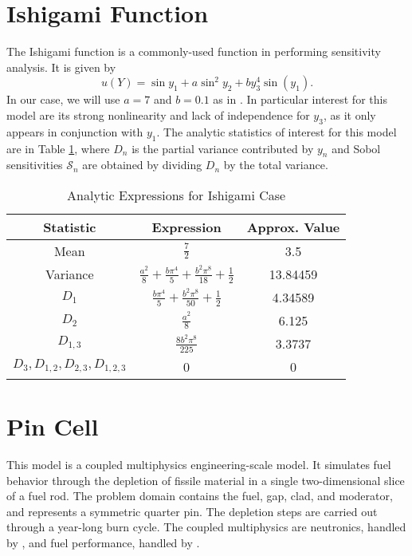 \section{Ishigami Function}\label{mod:ishigami}
The Ishigami function \cite{ishigami} is a commonly-used function in performing sensitivity analysis.  It is
given by
\begin{equation}
  u(Y) = \sin{y_1} + a\sin^2{y_2} + b y_3^4\sin(y_1).
\end{equation}
In our case, we will use $a=7$ and $b=0.1$ as in \cite{ishigami2}.  In particular interest for this model are
its strong nonlinearity and lack of independence for $y_3$, as it only appears in conjunction with $y_1$.  The
analytic statistics of interest for this model are in Table \ref{tab:ishigami moments}, where $D_n$ is the
partial variance contributed by $y_n$ and Sobol sensitivities $\mathcal{S}_n$ are obtained by dividing $D_n$
by the total variance.

\begin{table}[H]
  \centering
  \begin{tabular}{c|c|c}
  Statistic & Expression & Approx. Value \\\hline
  Mean & $\frac{7}{2}$ & 3.5 \\
  Variance & $\frac{a^2}{8} + \frac{b\pi^4}{5} + \frac{b^2\pi^8}{18} + \frac{1}{2}$ & 13.84459 \\
  $D_1$ & $\frac{b\pi^4}{5} + \frac{b^2\pi^8}{50} + \frac{1}{2} $ &  4.34589 \\
  $D_2$ & $\frac{a^2}{8}$ & 6.125 \\
  $D_{1,3}$ & $\frac{8b^2\pi^8}{225}$ & 3.3737 \\
  $D_3,D_{1,2},D_{2,3},D_{1,2,3}$ & 0 & 0
  \end{tabular}
  \caption{Analytic Expressions for Ishigami Case}
  \label{tab:ishigami moments}
\end{table}

\section{Pin Cell}\label{mod:pincell}
This model is a coupled multiphysics engineering-scale model.  It simulates fuel behavior through the depletion of fissile material
in a single two-dimensional slice of a fuel rod.  The problem domain contains the fuel, gap, clad, and
moderator, and represents a symmetric quarter pin.  The depletion steps are carried out through a year-long
burn cycle.
The coupled multiphysics are neutronics, handled by \rattlesnake{}, and fuel performance, handled by
\bison{}.  

